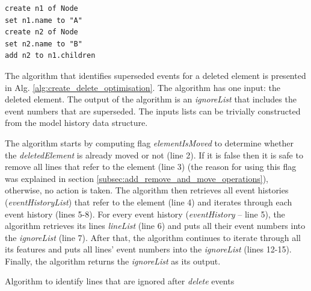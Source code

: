 \documentclass{llncs}
\begin{document}
\begin{lstlisting}[style=eol,caption={Change-based representation of the model of Fig. \ref{fig:initial_model} after removal of node \emph{n5}.},label=lst:cbpmodel_optimised]
create n1 of Node
set n1.name to "A"
create n2 of Node
set n2.name to "B"
add n2 to n1.children
\end{lstlisting}

The algorithm that identifies superseded events for a deleted element is presented in Alg. \ref{alg:create_delete_optimisation}.
The algorithm has one input: the deleted element.
The output of the algorithm is an \emph{ignoreList} that includes the event numbers that are superseded.
The inputs lists can be trivially constructed from the model history data structure.

The algorithm starts by computing flag \emph{elementIsMoved} to determine whether the \emph{deletedElement} is already moved or not (line 2).
If it is false then it is safe to remove all lines that refer to the element (line 3) (the reason for using this flag was explained in section \ref{subsec:add_remove_and_move_operations}), otherwise, no action is taken.
The algorithm then retrieves all event histories (\emph{eventHistoryList}) that refer to the element (line 4) and iterates through each event history (lines 5-8).
For every event history (\emph{eventHistory} -- line 5), the algorithm retrieves its lines \emph{lineList} (line 6) and puts all their event numbers into the \emph{ignoreList} (line 7).
After that, the algorithm continues to iterate through all its features and puts all lines' event numbers into the \emph{ignoreList} (lines 12-15). Finally, the algorithm returns the \emph{ignoreList} as its output.

\begin{algorithm}[H]
\begin{small}
\end{small}
\caption{Algorithm to identify lines that are ignored after \emph{delete} events}
\label{alg:create_delete_optimisation}
\end{algorithm}
\end{document}
